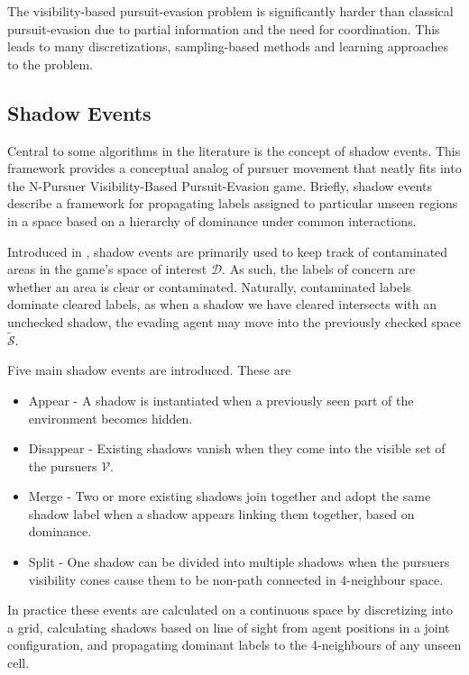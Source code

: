 \documentclass[conference]{IEEEtran}
\begin{document}
The visibility-based pursuit-evasion problem is significantly harder than classical pursuit-evasion due to partial information and the need for coordination. 
This leads to many discretizations, sampling-based methods and learning approaches to the problem.

\subsection{Shadow Events}\label{subsec:shadow_events}
Central to some algorithms in the literature is the concept of shadow events. 
This framework provides a conceptual analog of pursuer movement that neatly fits into the N-Pursuer Visibility-Based Pursuit-Evasion game.
Briefly, shadow events describe a framework for propagating labels assigned to particular unseen regions in a space based on a hierarchy of dominance under common interactions.

Introduced in \cite{guibas1999visibility}, shadow events are primarily used to keep track of contaminated areas in the game's space of interest $\mathcal{D}$.
As such, the labels of concern are whether an area is clear or contaminated.
Naturally, contaminated labels dominate cleared labels, as when a shadow we have cleared intersects with an unchecked shadow, the evading agent may move into the previously checked space $\mathcal{\tilde{S}}$.

Five main shadow events are introduced. These are
\begin{itemize}
	\item Appear - A shadow is instantiated when a previously seen part of the environment becomes hidden.
	\item Disappear - Existing shadows vanish when they come into the visible set of the pursuers $\mathcal{V}$.
	\item Merge - Two or more existing shadows join together and adopt the same shadow label when a shadow appears linking them together, based on dominance.
	\item Split - One shadow can be divided into multiple shadows when the pursuers visibility cones cause them to be non-path connected in 4-neighbour space.
\end{itemize}
In practice these events are calculated on a continuous space by discretizing into a grid, calculating shadows based on line of sight from agent positions in a joint configuration, and propagating dominant labels to the 4-neighbours of any unseen cell. 
\end{document}
